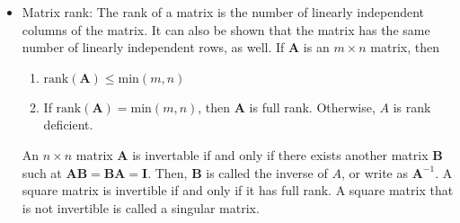 \documentclass[12pt]{article}
\begin{document}
\begin{itemize}
        \item Matrix rank: The rank of a matrix is the number of linearly independent columns of the matrix. It can also be shown that the matrix has the same number of linearly independent rows, as well. If $\mathbf{A}$ is an $m \times n$ matrix, then
            \begin{enumerate}
                \item $\text{rank}(\mathbf{A}) \leq \text{min}(m,n)$
                \item If $\text{rank}(\mathbf{A}) = \text{min}(m,n)$, then $\mathbf{A}$ is full rank. Otherwise, $A$ is rank deficient.
            \end{enumerate}
        An $n \times n$ matrix $\mathbf{A}$ is invertable if and only if there exists another matrix $\mathbf{B}$ such at $\mathbf{AB} = \mathbf{BA} = \mathbf{I}$. Then, $\mathbf{B}$ is called the inverse of $A$, or write as $\mathbf{A}^{-1}$. A square matrix is invertible if and only if it has full rank. A square matrix that is not invertible is called a singular matrix.


\end{itemize}
\end{document}
